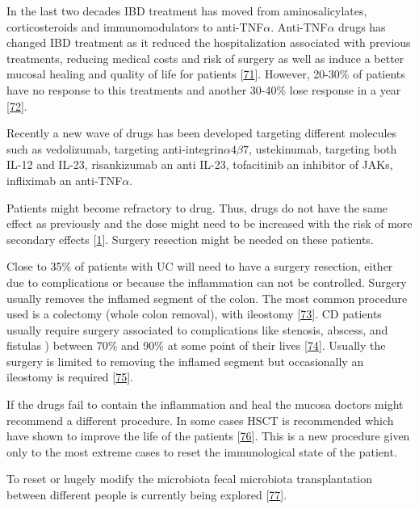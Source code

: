\documentclass[
  12pt,
  a4paper,
  twoside,
  openright]{book}
\begin{document}
In the last two decades IBD treatment has moved from aminosalicylates, corticosteroids and immunomodulators to anti-TNF\(\alpha\).
Anti-TNF\(\alpha\) drugs has changed IBD treatment as it reduced the hospitalization associated with previous treatments, reducing medical costs and risk of surgery as well as induce a better mucosal healing and quality of life for patients {[}\protect\hyperlink{ref-peyrin-biroulet2011}{71}{]}.
However, 20-30\% of patients have no response to this treatments and another 30-40\% lose response in a year {[}\protect\hyperlink{ref-billioud2011}{72}{]}.

Recently a new wave of drugs has been developed targeting different molecules such as vedolizumab, targeting anti-integrin\(\alpha 4 \beta 7\), ustekinumab, targeting both IL-12 and IL-23, risankizumab an anti IL-23, tofacitinib an inhibitor of JAKs, infliximab an anti-TNF\(\alpha\).

Patients might become refractory to drug.
Thus, drugs do not have the same effect as previously and the dose might need to be increased with the risk of more secondary effects {[}\protect\hyperlink{ref-raine2021}{1}{]}.
Surgery resection might be needed on these patients.

Close to 35\% of patients with UC will need to have a surgery resection, either due to complications or because the inflammation can not be controlled.
Surgery usually removes the inflamed segment of the colon.
The most common procedure used is a colectomy (whole colon removal), with ileostomy {[}\protect\hyperlink{ref-hwang2008}{73}{]}.
CD patients usually require surgery associated to complications like stenosis, abscess, and fistulas ) between 70\% and 90\% at some point of their lives {[}\protect\hyperlink{ref-gardiner2007}{74}{]}.
Usually the surgery is limited to removing the inflamed segment but occasionally an ileostomy is required {[}\protect\hyperlink{ref-lewis2010}{75}{]}.

If the drugs fail to contain the inflammation and heal the mucosa doctors might recommend a different procedure.
In some cases HSCT is recommended which have shown to improve the life of the patients {[}\protect\hyperlink{ref-corralizab}{76}{]}.
This is a new procedure given only to the most extreme cases to reset the immunological state of the patient.

To reset or hugely modify the microbiota fecal microbiota transplantation between different people is currently being explored {[}\protect\hyperlink{ref-weingarden2017}{77}{]}.
\end{document}

